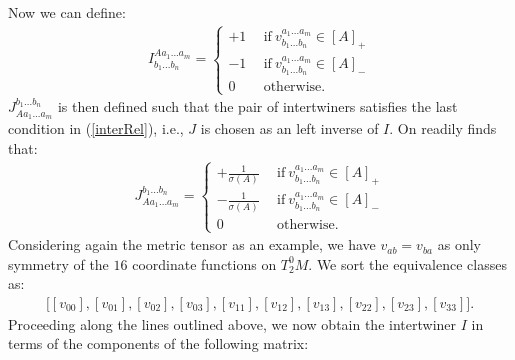 Now we can define:
\begin{align}\label{defI}
    I^{A a_1 ... a_m}_{b_1 ... b_n} = \begin{cases} 
        +1 \ \  &\text{if} \  v^{a_1 ... a_m}_{b_1 ... b_n} \in [A]_+ \\
        -1 \ \ &\text{if} \  v^{a_1 ... a_m}_{b_1 ... b_n} \in [A]_-  \\
        0 \ \   &\text{otherwise}. 
    \end{cases}
\end{align}
$J^{b_1 ... b_n}_{A a_1 ... a_m}$ is then defined such that the pair of intertwiners satisfies the last condition in (\ref{interRel}), i.e., $J$ is chosen as an left inverse of $I$. On readily finds that:
\begin{align}\label{defJ}
    J^{b_1 ... b_n}_{A a_1 ... a_m} = \begin{cases}  +\frac{1}{\sigma(A)} \ \ &\text{if} \  v^{a_1 ... a_m}_{b_1 ... b_n} \in [A]_+\\
    -\frac{1}{\sigma(A)} \ \  &\text{if} \  v^{a_1 ... a_m}_{b_1 ... b_n} \in [A]_- \\ 
    0   \ \ &\text{otherwise}.
    \end{cases}
\end{align}
Considering again the metric tensor as an example, we have $v_{ab} = v_{ba}$ as only symmetry of the $16$ coordinate functions on $T^0_2M$. We sort the equivalence classes as: 
\begin{align}
    \bigl[[v_{00}], [v_{01}], [v_{02}], [v_{03}], [v_{11}], [v_{12}], [v_{13}], [v_{22}], [v_{23}], [v_{33}]\bigr ].
\end{align}
Proceeding along the lines outlined above, we now obtain the intertwiner $I$ in terms of the components of the following matrix: 
